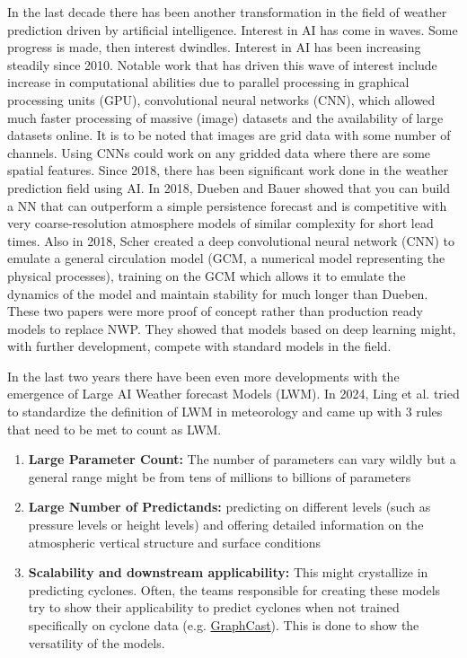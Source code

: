 In the last decade there has been another transformation in the field of weather prediction driven by artificial intelligence. Interest in AI has come in waves. Some progress is made, then interest dwindles. Interest in AI has been increasing steadily since 2010. Notable work that has driven this wave of interest include increase in computational abilities due to parallel processing in graphical processing units (GPU), convolutional neural networks (CNN), which allowed much faster processing of massive (image) datasets and the availability of large datasets online. It is to be noted that images are grid data with some number of channels. Using CNNs could work on any gridded data where there are some spatial features\cite{canNNBeatNWP}. Since 2018, there has been significant work done in the weather prediction field using AI. In 2018, Dueben and Bauer showed that you can build a NN that can outperform a simple persistence forecast and is competitive with very coarse-resolution atmosphere models of similar complexity for short lead times\cite{dueben2018}. Also in 2018, Scher created a deep convolutional neural network (CNN) to emulate a general circulation model (GCM, a numerical model representing the physical processes), training on the GCM which allows it to emulate the dynamics of the model and maintain stability for much longer than Dueben\cite{scher2018}. These two papers were more proof of concept rather than production ready models to replace NWP. They showed that models based on deep learning might, with further development, compete with standard models in the field.

In the last two years there have been even more developments with the emergence of Large AI Weather forecast Models (LWM). In 2024, Ling et al.\cite{SecondRevolution} tried to standardize the definition of LWM in meteorology and came up with 3 rules that need to be met to count as LWM.

\begin{enumerate}[label = Rule \arabic*:]
    \item \textbf{Large Parameter Count:} The number of parameters can vary wildly but a general range might be from tens of millions to billions of parameters
    \item \textbf{Large Number of Predictands:} predicting on different levels (such as pressure levels or height levels) and offering detailed information on the atmospheric vertical structure and surface conditions
    \item \textbf{Scalability and downstream applicability:} This might crystallize in predicting cyclones. Often, the teams responsible for creating these models try to show their applicability to predict cyclones when not trained specifically on cyclone data (e.g. \href{https://www.youtube.com/watch?v=PD1v5PCJs_o&ab_channel=GregBronevetsky}{GraphCast})\cite{SecondRevolution}. This is done to show the versatility of the models.
\end{enumerate}

